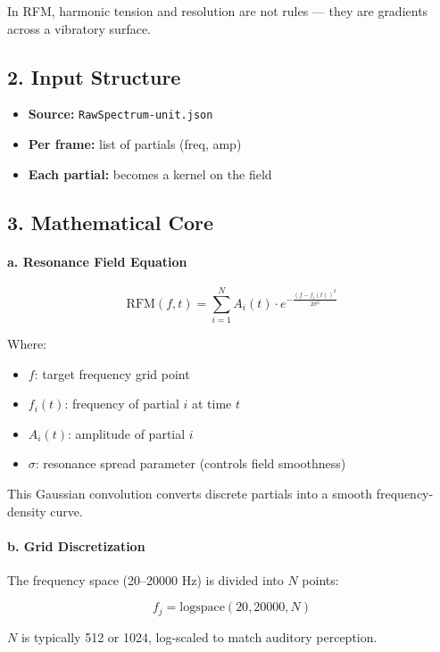 In RFM, harmonic tension and resolution are not rules — they are gradients across a vibratory surface.

\subsection*{2. Input Structure}

\begin{itemize}
    \item \textbf{Source:} \texttt{RawSpectrum-unit.json}
    \item \textbf{Per frame:} list of partials (freq, amp)
    \item \textbf{Each partial:} becomes a kernel on the field
\end{itemize}

\subsection*{3. Mathematical Core}

\paragraph{a. Resonance Field Equation}

\[
\text{RFM}(f, t) = \sum_{i=1}^N A_i(t) \cdot e^{-\frac{(f - f_i(t))^2}{2\sigma^2}}
\]

Where:

\begin{itemize}
    \item $f$: target frequency grid point
    \item $f_i(t)$: frequency of partial $i$ at time $t$
    \item $A_i(t)$: amplitude of partial $i$
    \item $\sigma$: resonance spread parameter (controls field smoothness)
\end{itemize}

This Gaussian convolution converts discrete partials into a smooth frequency-density curve.

\paragraph{b. Grid Discretization}

The frequency space (20–20000 Hz) is divided into $N$ points:

\[
f_j = \text{logspace}(20, 20000, N)
\]

$N$ is typically 512 or 1024, log-scaled to match auditory perception.

